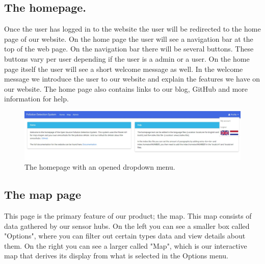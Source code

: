 \documentclass[a4paper]{article}
\begin{document}
\pagebreak

\subsection{The homepage.}
Once the user has logged in to the website the user will be redirected to the home page of our website. On the home page the user will see a navigation bar at the top of the web page. On the navigation bar there will be several buttons. These buttons vary per user depending if the user is a admin or a user. 
\newline
\newline
On the home page itself the user will see a short welcome message as well. In the welcome message we introduce the user to our website and explain the features we have on our website. The home page also contains links to our blog, GitHub and more information for help.
\begin{figure}[h!]
  \caption{The homepage with an opened dropdown menu.}
  \centering
  \includegraphics[width=1\textwidth]{home-dropdown}
\end{figure}
\pagebreak

\subsection{The map page}
This page is the primary feature of our product; the map. This map consists of data gathered by our sensor hubs. On the left you can see a smaller box called "Options", where you can filter out certain types data and view details about them. On the right you can see a larger called "Map", which is our interactive map that derives its display from what is selected in the Options menu.
\newline
\end{document}
